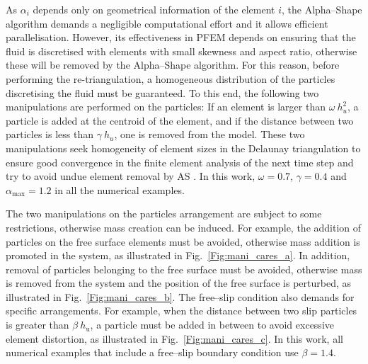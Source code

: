 \documentclass[final,3p,times]{elsarticle}
\begin{document}
As $\alpha_i$ depends only on geometrical information of the element $i$, the Alpha--Shape algorithm demands a negligible computational effort and it allows efficient parallelisation. However, its effectiveness in PFEM depends on ensuring that the fluid is discretised with elements with small skewness and aspect ratio, otherwise these will be removed by the Alpha--Shape algorithm. For this reason, before performing the re-triangulation, a homogeneous distribution of the particles discretising the fluid must be guaranteed. To this end, the following two manipulations are performed on the particles: If an element is larger than $\omega \: h_u^2$, a particle is added at the centroid of the element, and if the distance between two particles is less than $\gamma \: h_u$, one is removed from the model. These two manipulations seek homogeneity of element sizes in the Delaunay triangulation to ensure good convergence in the finite element analysis of the next time step and try to avoid undue element removal by AS \citep{cerquaglia2019development,cremonesi2020state}. In this work, $\omega = 0.7$, $\gamma = 0.4$ and $\alpha_\mathrm{max} = 1.2$ in all the numerical examples.

The two manipulations on the particles arrangement are subject to some restrictions, otherwise mass creation can be induced. For example, the addition of particles on the free surface elements must be avoided, otherwise mass addition is promoted in the system, as illustrated in Fig.~\ref{Fig:mani_cares_a}. In addition, removal of particles belonging to the free surface must be avoided, otherwise mass is removed from the system and the position of the free surface is perturbed, as illustrated in Fig.~\ref{Fig:mani_cares_b}. The free--slip condition also demands for specific arrangements. For example, when the distance between two slip particles is greater than $\beta \: h_\mathrm{u}$, a particle must be added in between to avoid excessive element distortion, as illustrated in Fig.~\ref{Fig:mani_cares_c}. In this work, all numerical examples that include a free--slip boundary condition use $\beta = 1.4$.
\end{document}
